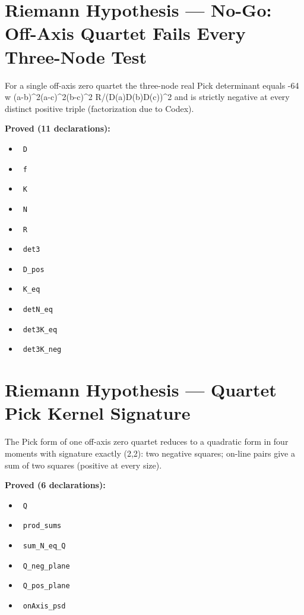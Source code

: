 \documentclass{report}
\theoremstyle{definition}
\begin{document}
\section{Riemann Hypothesis --- No-Go: Off-Axis Quartet Fails Every Three-Node Test}
For a single off-axis zero quartet the three-node real Pick determinant equals -64 w (a-b)^2(a-c)^2(b-c)^2 R/(D(a)D(b)D(c))^2 and is strictly negative at every distinct positive triple (factorization due to Codex).

\noindent\textbf{Proved (11 declarations):}
\begin{itemize}
  \item {}\leanok\ \texttt{D}
  \item {}\leanok\ \texttt{f}
  \item {}\leanok\ \texttt{K}
  \item {}\leanok\ \texttt{N}
  \item {}\leanok\ \texttt{R}
  \item {}\leanok\ \texttt{det3}
  \item {}\leanok\ \texttt{D\_pos}
  \item {}\leanok\ \texttt{K\_eq}
  \item {}\leanok\ \texttt{detN\_eq}
  \item {}\leanok\ \texttt{det3K\_eq}
  \item {}\leanok\ \texttt{det3K\_neg}
\end{itemize}

\section{Riemann Hypothesis --- Quartet Pick Kernel Signature}
The Pick form of one off-axis zero quartet reduces to a quadratic form in four moments with signature exactly (2,2): two negative squares; on-line pairs give a sum of two squares (positive at every size).

\noindent\textbf{Proved (6 declarations):}
\begin{itemize}
  \item {}\leanok\ \texttt{Q}
  \item {}\leanok\ \texttt{prod\_sums}
  \item {}\leanok\ \texttt{sum\_N\_eq\_Q}
  \item {}\leanok\ \texttt{Q\_neg\_plane}
  \item {}\leanok\ \texttt{Q\_pos\_plane}
  \item {}\leanok\ \texttt{onAxis\_psd}
\end{itemize}
\end{document}
